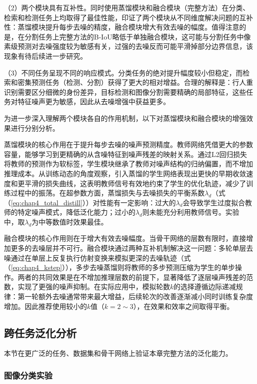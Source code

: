 （2）两个模块具有互补性。同时使用蒸馏模块和融合模块（完整方法）在分类、检索和检测任务上均取得了最佳性能，印证了两个模块从不同维度解决问题的互补性：蒸馏模块提升每步去噪的精度，融合模块增大有效去噪的幅度。值得注意的是，在分割任务上完整方法的B-IoU略低于单独融合模块，这可能与分割任务中像素级预测对去噪强度较为敏感有关，过强的去噪反而可能平滑掉部分边界信息，该现象有待后续进一步研究。

（3）不同任务呈现不同的响应模式。分类任务的绝对提升幅度较小但稳定，而检索和密集预测任务（检测、分割）获得了更大的相对增益。合理的解释是：行人重识别需要区分细微的身份差异，目标检测和图像分割需要精确的局部特征，这些任务对特征噪声更为敏感，因此从去噪增强中获益更多。

为进一步深入理解两个模块各自的作用机制，以下对蒸馏模块和融合模块的增强效果进行分别分析。

蒸馏模块的核心作用在于提升每步去噪的噪声预测精度。教师网络凭借更大的参数容量，能够学习到更精确的从含噪特征到噪声残差的映射关系。通过L2回归损失将教师的预测作为软标签，学生模块继承了教师对噪声结构的归纳偏置，而不增加推理成本。从训练动态的角度观察，引入蒸馏的学生网络表现出更快的早期收敛速度和更平滑的损失曲线，这表明教师信号有效地约束了学生的优化轨迹，减少了训练过程中的振荡。在超参数方面，蒸馏损失与去噪损失的平衡系数$\lambda_d$（式（\ref{eq:chap4_total_distill}））对性能有一定影响：过大的$\lambda_d$会导致学生过度拟合教师的特定噪声模式，降低泛化能力；过小的$\lambda_d$则未能充分利用教师信号。实验中，取$\lambda_d$为中等数值时效果最佳。

融合模块的核心作用则在于增大有效去噪幅度。当骨干网络的层数有限时，直接增加更多的去噪层并不可行。融合模块通过两种互补机制解决这一问题：多轮单层去噪通过在单层上反复执行仿射变换来模拟更深的去噪轨迹（式（\ref{eq:chap4_kstep}）），多步去噪蒸馏则将教师的多步预测压缩为学生的单步操作。两者的共同效果是在不增加推理层数的前提下，显著降低了逐层噪声残差的范数，实现了更强的噪声抑制。在实际应用中，模拟轮数$k$的选择遵循边际递减规律：第一轮额外去噪通常带来最大增益，后续轮次的改善逐渐减小同时训练复杂度增加。因此推荐使用较小的$k$值（$k = 2 \sim 3$），在效果和效率之间取得平衡。

\subsection{跨任务泛化分析}

本节在更广泛的任务、数据集和骨干网络上验证本章完整方法的泛化能力。

\subsubsection{图像分类实验}

